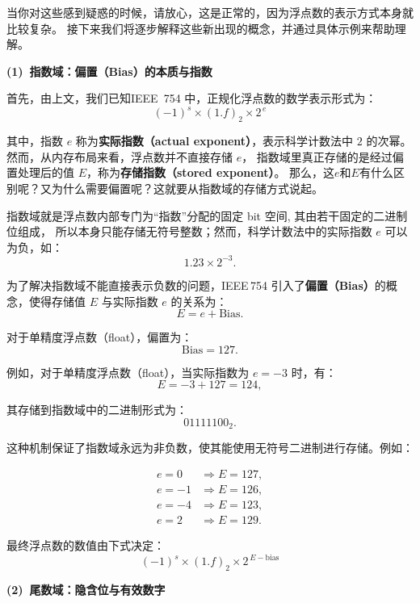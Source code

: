 当你对这些感到疑惑的时候，请放心，这是正常的，因为浮点数的表示方式本身就比较复杂。
接下来我们将逐步解释这些新出现的概念，并通过具体示例来帮助理解。
\newpage

\vspace{1em}


\noindent\textbf{(1)~指数域：偏置（Bias）的本质与指数}\vspace{0.5em}

首先，由上文，我们已知IEEE~754 中，正规化浮点数的数学表示形式为：
\[
(-1)^s \times (1.f)_2 \times 2^{\,e}
\]

其中，指数 $e$ 称为\textbf{实际指数（actual exponent）}，表示科学计数法中 $2$ 的次幂。
然而，从内存布局来看，浮点数并不直接存储 $e$，
指数域里真正存储的是经过偏置处理后的值 $E$，称为\textbf{存储指数（stored exponent）}。
那么，这$e$和$E$有什么区别呢？又为什么需要偏置呢？这就要从指数域的存储方式说起。


指数域就是浮点数内部专门为“指数”分配的固定 bit 空间,
其由若干固定的二进制位组成，
所以本身只能存储无符号整数；然而，科学计数法中的实际指数 $e$ 可以为负，如：
\[
1.23 \times 2^{-3}.
\]

为了解决指数域不能直接表示负数的问题，IEEE\,754 引入了\textbf{偏置（Bias）}的概念，使得存储值 $E$ 与实际指数 $e$ 的关系为：
\[
E = e + \mathrm{Bias}.
\]

对于单精度浮点数（float），偏置为：\[\mathrm{Bias} = 127.\]

例如，对于单精度浮点数（float），当实际指数为 $e=-3$ 时，有：
\[
E = -3 + 127 = 124,
\]

其存储到指数域中的二进制形式为：
\[
01111100_2.
\]



这种机制保证了指数域永远为非负数，使其能使用无符号二进制进行存储。例如：

\[
\begin{aligned}
e = 0  &\Rightarrow E = 127,\\
e = -1 &\Rightarrow E = 126,\\
e = -4 &\Rightarrow E = 123,\\
e = 2  &\Rightarrow E = 129.
\end{aligned}
\]

最终浮点数的数值由下式决定：
\[
(-1)^s \times (1.f)_2 \times 2^{\,E - \mathrm{bias}}
\]







\newpage
\noindent\textbf{(2)~尾数域：隐含位与有效数字}\vspace{0.5em}


